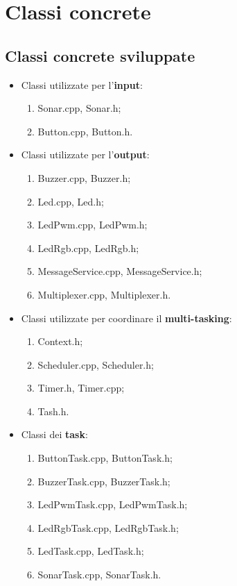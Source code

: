 \chapter{Classi concrete}
\section{Classi concrete sviluppate}
\begin{itemize}
	\item Classi utilizzate per l'\textbf{input}:
	\begin{enumerate}
		\item Sonar.cpp, Sonar.h;
		\item Button.cpp, Button.h.
	\end{enumerate}
	\item Classi utilizzate per l'\textbf{output}:
	\begin{enumerate}
		\item Buzzer.cpp, Buzzer.h;
		\item Led.cpp, Led.h;
		\item LedPwm.cpp, LedPwm.h;
		\item LedRgb.cpp, LedRgb.h;
		\item MessageService.cpp, MessageService.h;
		\item Multiplexer.cpp, Multiplexer.h.
	\end{enumerate}
	\item Classi utilizzate per coordinare il \textbf{multi-tasking}:
	\begin{enumerate}
		\item Context.h;
		\item Scheduler.cpp, Scheduler.h;
		\item Timer.h, Timer.cpp;
		\item Tash.h.
	\end{enumerate}
	\item Classi dei \textbf{task}:
	\begin{enumerate}
		\item ButtonTask.cpp, ButtonTask.h;
		\item BuzzerTask.cpp, BuzzerTask.h;
		\item LedPwmTask.cpp, LedPwmTask.h;
		\item LedRgbTask.cpp, LedRgbTask.h;
		\item LedTask.cpp, LedTask.h;
		\item SonarTask.cpp, SonarTask.h.
	\end{enumerate}
\end{itemize}

